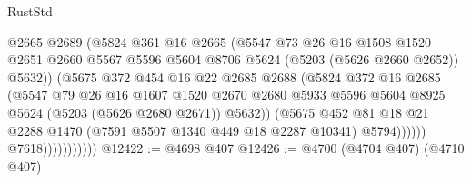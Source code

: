 \begin{lexlean}{RustStd}
\begin{coremodule}
                                  @2665
                                  @2689
                                  (@5824
                                    @361
                                    @16
                                    @2665
                                    (@5547
                                      @73
                                      @26
                                      @16
                                      @1508
                                      @1520
                                      @2651
                                      @2660
                                      @5567
                                      @5596
                                      @5604
                                      @8706
                                      @5624
                                      (@5203 (@5626 @2660 @2652))
                                      @5632))
                                  (@5675
                                    @372
                                    @454
                                    @16
                                    @22
                                    @2685
                                    @2688
                                    (@5824
                                      @372
                                      @16
                                      @2685
                                      (@5547
                                        @79
                                        @26
                                        @16
                                        @1607
                                        @1520
                                        @2670
                                        @2680
                                        @5933
                                        @5596
                                        @5604
                                        @8925
                                        @5624
                                        (@5203 (@5626 @2680 @2671))
                                        @5632))
                                    (@5675
                                      @452
                                      @81
                                      @18
                                      @21
                                      @2288
                                      @1470
                                      (@7591 @5507 @1340 @449 @18 @2287 @10341)
                                      @5794))))))
                          @7618)))))))))))
@12422 := @4698 @407
@12426 := @4700 (@4704 @407) (@4710 @407)

\end{coremodule}
\end{lexlean}

